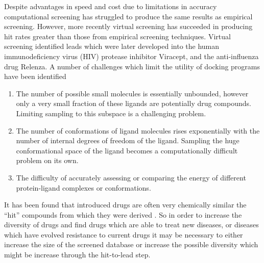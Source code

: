 Despite advantages in speed and cost due to limitations in accuracy computational screening has struggled to produce the same results as empirical screening.
However, more recently virtual screening has succeeded in producing hit rates greater than those from empirical screening techniques.
Virtual screening identified leads which were later developed into the human immunodeficiency virus (HIV) protease inhibitor Viracept, and the anti-influenza drug Relenza.
A number of challenges which limit the utility of docking programs have been identified
\begin{enumerate}
\item The number of possible small molecules is essentially unbounded, however only a very small fraction of these ligands are potentially drug compounds. Limiting sampling to this subspace is a challenging problem.
\item The number of conformations of ligand molecules rises exponentially with the number of internal degrees of freedom of the ligand. Sampling the huge conformational space of the ligand becomes a computationally difficult problem on its own.
\item The difficulty of accurately assessing or comparing the energy of different protein-ligand complexes or conformations\cite{shoichet2004virtual}.
\end{enumerate}

It has been found that introduced drugs are often very chemically similar the ``hit'' compounds from which they were derived \cite{proudfoot2002drugs}.
So in order to increase the diversity of drugs and find drugs which are able to treat new diseases, or diseases which have evolved resistance to current drugs it may be necessary to either increase the size of the screened database or increase the possible diversity which might be increase through the hit-to-lead step.


